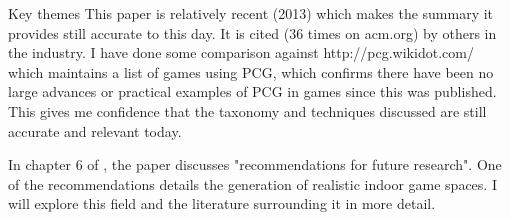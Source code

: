 \documentclass[review]{cmpreport}
\begin{document}
\begin{section}{Key themes}
This paper is relatively recent (2013) which makes the summary it provides still accurate to this day. It is cited (36 times on acm.org) by others in the industry. I have done some comparison against http://pcg.wikidot.com/ which maintains a list of games using PCG, which confirms there have been no large advances or practical examples of PCG in games since this was published. This gives me confidence that the taxonomy and techniques discussed are still accurate and relevant today. \par 
In chapter 6 of \cite{Hendrikx:2013:PCG:2422956.2422957}, the paper discusses "recommendations for future research". One of the recommendations details the generation of realistic indoor game spaces. I will explore this field and the literature surrounding it in more detail. 

\end{section}
\end{document}
